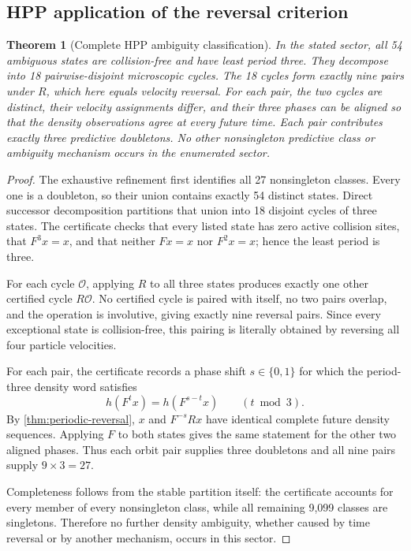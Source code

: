 \documentclass[11pt]{article}
\newtheorem{theorem}{Theorem}
\begin{document}
\subsection{HPP application of the reversal criterion}

\begin{theorem}[Complete HPP ambiguity classification]
\label{thm:hpp-classification}
In the stated sector, all 54 ambiguous states are collision-free and have least
period three. They decompose into 18 pairwise-disjoint microscopic cycles. The 18
cycles form exactly nine pairs under $R$, which here equals velocity reversal.
For each pair, the two cycles are distinct, their velocity assignments differ,
and their three phases can be aligned so that the density observations agree at
every future time. Each pair contributes exactly three predictive doubletons.
No other nonsingleton predictive class or ambiguity mechanism occurs in the
enumerated sector.
\end{theorem}

\begin{proof}
The exhaustive refinement first identifies all 27 nonsingleton classes. Every one
is a doubleton, so their union contains exactly 54 distinct states. Direct
successor decomposition partitions that union into 18 disjoint cycles of three
states. The certificate checks that every listed state has zero active collision
sites, that $F^3x=x$, and that neither $Fx=x$ nor $F^2x=x$; hence the least period
is three.

For each cycle $\mathcal O$, applying $R$ to all three states produces exactly one
other certified cycle $R\mathcal O$. No certified cycle is paired with itself,
no two pairs overlap, and the operation is involutive, giving exactly nine
reversal pairs. Since every exceptional state is collision-free, this pairing is
literally obtained by reversing all four particle velocities.

For each pair, the certificate records a phase shift $s\in\{0,1\}$ for which the
period-three density word satisfies
\[
h(F^t x)=h(F^{s-t}x)\qquad(t\bmod 3).
\]
By \cref{thm:periodic-reversal}, $x$ and $F^{-s}Rx$ have identical complete future
density sequences. Applying $F$ to both states gives the same statement for the
other two aligned phases. Thus each orbit pair supplies three doubletons and all
nine pairs supply $9\times3=27$.

Completeness follows from the stable partition itself: the certificate accounts
for every member of every nonsingleton class, while all remaining 9,099 classes
are singletons. Therefore no further density ambiguity, whether caused by time
reversal or by another mechanism, occurs in this sector.
\end{proof}
\end{document}
